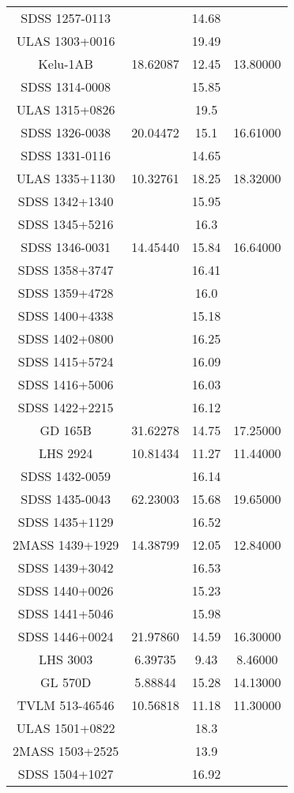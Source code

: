 \begin{table}
\begin{tabular}{cccc}
SDSS 1257-0113 &  & 14.68 &  \\
ULAS 1303+0016 &  & 19.49 &  \\
Kelu-1AB & 18.62087 & 12.45 & 13.80000 \\
SDSS 1314-0008 &  & 15.85 &  \\
ULAS 1315+0826 &  & 19.5 &  \\
SDSS 1326-0038 & 20.04472 & 15.1 & 16.61000 \\
SDSS 1331-0116 &  & 14.65 &  \\
ULAS 1335+1130 & 10.32761 & 18.25 & 18.32000 \\
SDSS 1342+1340 &  & 15.95 &  \\
SDSS 1345+5216 &  & 16.3 &  \\
SDSS 1346-0031 & 14.45440 & 15.84 & 16.64000 \\
SDSS 1358+3747 &  & 16.41 &  \\
SDSS 1359+4728 &  & 16.0 &  \\
SDSS 1400+4338 &  & 15.18 &  \\
SDSS 1402+0800 &  & 16.25 &  \\
SDSS 1415+5724 &  & 16.09 &  \\
SDSS 1416+5006 &  & 16.03 &  \\
SDSS 1422+2215 &  & 16.12 &  \\
GD 165B & 31.62278 & 14.75 & 17.25000 \\
LHS 2924 & 10.81434 & 11.27 & 11.44000 \\
SDSS 1432-0059 &  & 16.14 &  \\
SDSS 1435-0043 & 62.23003 & 15.68 & 19.65000 \\
SDSS 1435+1129 &  & 16.52 &  \\
2MASS 1439+1929 & 14.38799 & 12.05 & 12.84000 \\
SDSS 1439+3042 &  & 16.53 &  \\
SDSS 1440+0026 &  & 15.23 &  \\
SDSS 1441+5046 &  & 15.98 &  \\
SDSS 1446+0024 & 21.97860 & 14.59 & 16.30000 \\
LHS 3003 & 6.39735 & 9.43 & 8.46000 \\
GL 570D & 5.88844 & 15.28 & 14.13000 \\
TVLM 513-46546 & 10.56818 & 11.18 & 11.30000 \\
ULAS 1501+0822 &  & 18.3 &  \\
2MASS 1503+2525 &  & 13.9 &  \\
SDSS 1504+1027 &  & 16.92 &  \\

\end{tabular}
\end{table}
